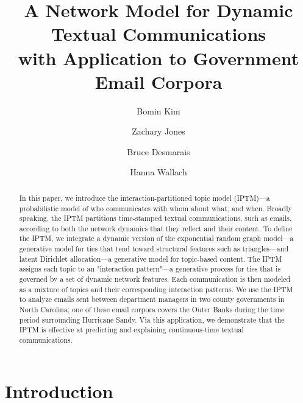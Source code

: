 \documentclass[a4paper]{article}
\title{A Network Model for Dynamic Textual Communications \\with Application to
	Government Email Corpora}
\author[1]{Bomin Kim}
\author[1]{Zachary Jones}
\author[1]{Bruce Desmarais}
\author[2,3]{Hanna Wallach}
\affil[1]{Pennsylvania State University}
\affil[2]{Microsoft Research NYC}
\affil[3]{University of Massachusetts Amherst}
\begin{document}
\maketitle
\begin{abstract}
	
	\noindent In this paper, we introduce the interaction-partitioned topic model
	(IPTM)---a probabilistic model of who communicates with whom about
	what, and when. Broadly speaking, the IPTM partitions time-stamped
	textual communications, such as emails, according to both the network
	dynamics that they reflect and their content. To define the IPTM, we
	integrate a dynamic version of the exponential random graph model---a
	generative model for ties that tend toward structural features such as
	triangles---and latent Dirichlet allocation---a generative model for
	topic-based content. The IPTM assigns each topic to an "interaction
	pattern"---a generative process for ties that is governed by a set of
	dynamic network features. Each communication is then modeled as a
	mixture of topics and their corresponding interaction patterns. We use
	the IPTM to analyze emails sent between department managers in two
	county governments in North Carolina; one of these email corpora
	covers the Outer Banks during the time period surrounding Hurricane
	Sandy. Via this application, we demonstrate that the IPTM is effective
	at predicting and explaining continuous-time textual communications.
\end{abstract}
\section{Introduction} \label{sec: Introduction}
\end{document}
